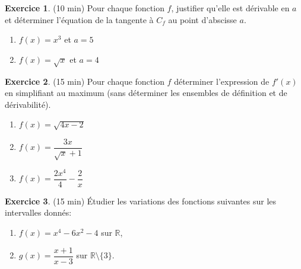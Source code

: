 \documentclass{exam}
\theoremstyle{definition}
\newtheorem{exercice}{Exercice}
\begin{document}
\begin{exercice}{(10 min)}
    Pour chaque fonction $f$, justifier qu’elle est dérivable en $a$ et déterminer l’équation de la tangente à $C_f$ au point d’abscisse $a$.
    \begin{enumerate}
        \item $f(x) = x^3$ et $a = 5$
        \item $f(x) = \sqrt{x}$ et $a = 4$
    \end{enumerate}
    \end{exercice}
    
    \begin{exercice}{(15 min)}
    Pour chaque fonction $f$ déterminer l'expression de $f'(x)$ en simplifiant au maximum (sans déterminer les ensembles de définition et de dérivabilité).
    \begin{enumerate}
        \item $f(x) = \sqrt{4x - 2}$
        \item $f(x) = \dfrac{3x}{\sqrt{x} + 1}$
        \item $f(x) = \dfrac{2x^4}{4} - \dfrac{2}{x}$
    \end{enumerate}
    \end{exercice}
\begin{exercice}{(15 min)}
Étudier les variations des fonctions suivantes sur les intervalles donnés:
\begin{enumerate}
    \item $f(x) = x^4 - 6x^2 - 4$ sur $\mathbb{R}$,
    \item $g(x) = \dfrac{x+1}{x-3}$ sur $\mathbb{R} \setminus \{3\}$.
\end{enumerate}
\end{exercice}
\end{document}

